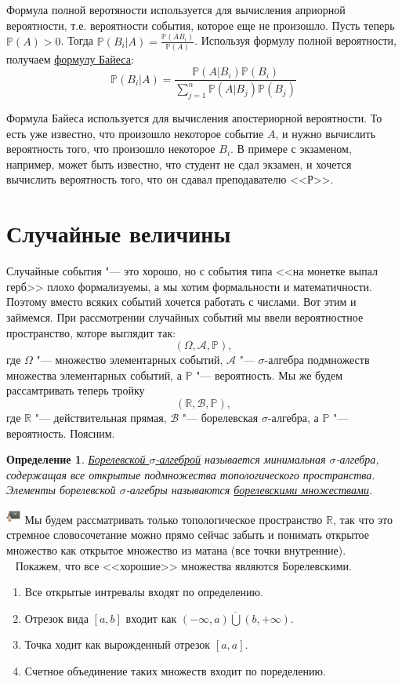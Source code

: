 \documentclass[12pt]{article}
\newtheorem{Def}{Определение}
\newenvironment{Ex}{{\bf Пример}\ }{}
\newenvironment{Wtf}{\includegraphics[height=5mm]{ping}}{}
\numberwithin{Th}{section}
\numberwithin{Def}{section}
\numberwithin{Lem}{section}
\numberwithin{St}{section}
\numberwithin{equation}{section}
\newcommand\Pro{\mathbb{P}} %
\newcommand\Ev{\mathscr{A}} %
\newcommand\Bor{\mathscr{B}} %
\newcommand\Real{\mathbb{R}} %
\begin{document}
Формула полной веротяности используется для вычисления априорной вероятности, т.е. вероятности события, которое  еще не произошло.
Пусть теперь \\$\Pro(A) > 0$. Тогда $\Pro(B_i|A)=\frac{\Pro(AB_i)}{\Pro(A)}$. Используя формулу полной вероятности, получаем \underline{формулу Байеса}:
$$\Pro(B_i|A)=\frac{\Pro(A|B_i)\Pro(B_i)}{\sum\limits_{j=1}^n\Pro(A|B_j)\Pro(B_j)}$$

Формула Байеса используется для вычисления апостериорной вероятности. То есть уже известно, что произошло некоторое событие $A$, и нужно вычислить вероятность
того, что произошло некоторое $B_i$. В примере с экзаменом, например, может быть известно, что студент не сдал экзамен, и хочется вычислить вероятность того, что он
сдавал преподавателю <<Р>>.

\newpage
\section{Случайные величины}

\qquad Случайные события "--- это хорошо, но с события типа <<на монетке выпал герб>> плохо формализуемы, а мы хотим формальности и математичности. Поэтому вместо всяких событий хочется работать с числами. Вот этим и займемся. При рассмотрении случайных событий мы ввели вероятностное пространство, которе выглядит так:
$$(\Omega, \Ev, \Pro),$$
где $\Omega$ "--- множество элементарных событий, $\Ev$ "--- $\sigma$-алгебра подмножеств множества элементарных событий, а $\Pro$ "--- вероятность. Мы же будем рассамтривать теперь тройку
$$(\Real, \Bor, \Pro),$$
где $\Real$ "--- действительная прямая, $\Bor$ "--- борелевская $\sigma$-алгебра, а $\Pro$ "--- вероятность. Поясним.

\begin{Def}
\underline{Борелевской $\sigma$-алгеброй} называется минимальная $\sigma$-алгебра, содержащая все открытые подмножества топологического пространства. Элементы борелевской $\sigma$-алгебры называются \underline{борелевскими множествами}.
\end{Def}
\begin{Wtf}
Мы будем рассматривать только топологическое пространство $\Real$, так что это стремное словосочетание можно прямо 
сейчас забыть и понимать открытое множество как открытое множество из матана (все точки внутренние).
\end{Wtf}\\
\begin{Ex}
Покажем, что все <<хорошие>> множества являются Борелевскими.
\begin{enumerate}
\item Все открытые интревалы входят по определению.
\item Отрезок вида $[a, b]$ входит как $\overline{(-\infty, a) \bigcup (b, +\infty)}$.
\item Точка ходит как вырожденный отрезок $[a, a]$.
\item Счетное объединение таких множеств входит по поределению.
\end{enumerate}
\end{Ex}
\end{document}
